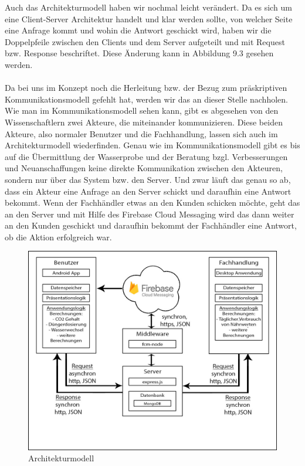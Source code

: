 Auch das Architekturmodell haben wir nochmal leicht verändert. Da es sich um eine Client-Server Architektur handelt und klar werden sollte, von welcher Seite eine Anfrage kommt und wohin die Antwort geschickt wird, haben wir die Doppelpfeile zwischen den Clients und dem Server aufgeteilt und mit Request bzw. Response beschriftet. Diese Änderung kann in Abbildung 9.3 gesehen werden.
\\ \\
Da bei uns im Konzept noch die Herleitung bzw. der Bezug zum präskriptiven Kommunikationsmodell gefehlt hat, werden wir das an dieser Stelle nachholen. Wie man im Kommunikationsmodell sehen kann, gibt es abgesehen von den Wissenschaftlern zwei Akteure, die miteinander kommunizieren. Diese beiden Akteure, also normaler Benutzer und die Fachhandlung, lassen sich auch im Architekturmodell wiederfinden. Genau wie im Kommunikationsmodell gibt es bis auf die Übermittlung der Wasserprobe und der Beratung bzgl. Verbesserungen und Neuanschaffungen keine direkte Kommunikation zwischen den Akteuren, sondern nur über das System bzw. den Server. Und zwar läuft das genau so ab, dass ein Akteur eine Anfrage an den Server schickt und daraufhin eine Antwort bekommt. Wenn der Fachhändler etwas an den Kunden schicken möchte, geht das an den Server und mit Hilfe des Firebase Cloud Messaging wird das dann weiter an den Kunden geschickt und daraufhin bekommt der Fachhändler eine Antwort, ob die Aktion erfolgreich war.

\begin{figure}[htbp]
\centering
\includegraphics[width=\linewidth]{Architektur}
\caption{Architekturmodell}
\end{figure}


